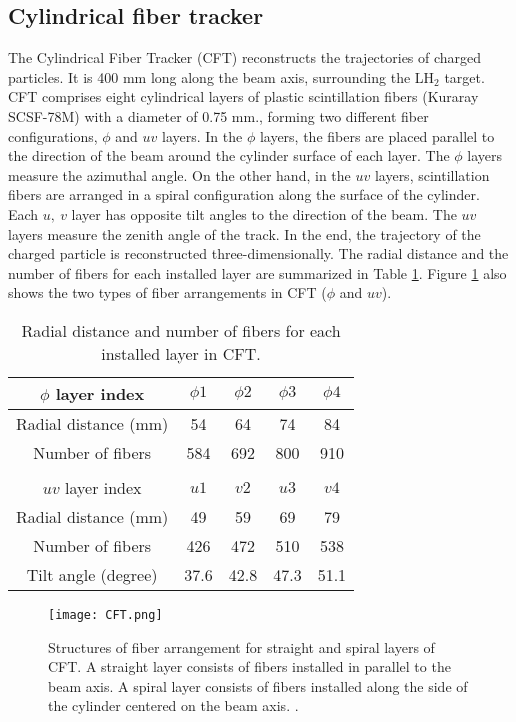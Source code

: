 \subsection{Cylindrical fiber tracker}
The Cylindrical Fiber Tracker (CFT) reconstructs the trajectories of charged particles. It is 400 mm long along the beam axis, surrounding the LH$_2$ target. CFT comprises eight cylindrical layers of plastic scintillation fibers (Kuraray SCSF-78M) with a diameter of 0.75 mm., forming two different fiber configurations, $\phi$ and $uv$ layers. In the $\phi$ layers, the fibers are placed parallel to the direction of the beam around the cylinder surface of each layer. The $\phi$ layers measure the azimuthal angle. On the other hand, in the $uv$ layers, scintillation fibers are arranged in a spiral configuration along the surface of the cylinder. Each $u,\ v$ layer has opposite tilt angles to the direction of the beam. The $uv$ layers measure the zenith angle of the track. In the end, the trajectory of the charged particle is reconstructed three-dimensionally. 
The radial distance and the number of fibers for each installed layer are summarized in Table \ref{tab-CFT}.
Figure \ref{fig-CFT} also shows the two types of fiber arrangements in CFT ($\phi$ and $uv$).

\begin{table}[h]
  \begin{center}
    \caption{Radial distance and number of fibers for each installed layer in CFT.}
    \begin{tabular}{ccccc} \hline \hline
      $\phi$ layer index & $\phi1$ & $\phi2$ & $\phi3$ & $\phi4$ \\ \hline
      Radial distance (mm) & 54 & 64 & 74 & 84 \\
      Number of fibers & 584 & 692 & 800 & 910 \\ \hline\hline
      \\
      \hline \hline
      $uv$ layer index & $u1$ & $v2$ & $u3$ & $v4$ \\ \hline
      Radial distance (mm) & 49 & 59 & 69 & 79 \\
      Number of fibers & 426 & 472 & 510 & 538 \\ 
      Tilt angle (degree) & 37.6 & 42.8 & 47.3 & 51.1 \\
      \hline\hline
   \end{tabular}
   \label{tab-CFT}
   \end{center}
\end{table}

\begin{figure}[!h]
 \begin{center}
   \texttt{[image: CFT.png]}
   \caption{Structures of fiber arrangement for straight and spiral layers of CFT. A straight layer consists of fibers installed in parallel to the beam axis. A spiral layer consists of fibers installed along the side of the cylinder centered on the beam axis. \cite{Aka-2020}.}
   \label{fig-CFT}
 \end{center}
\end{figure}

